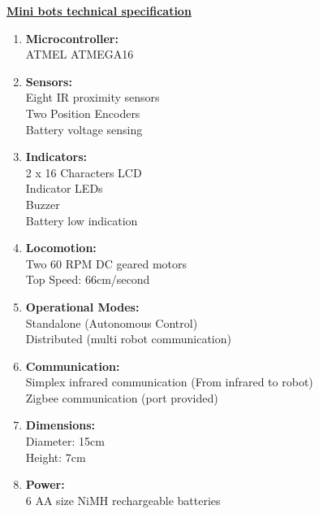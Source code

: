 \documentclass[a4paper,12pt,oneside]{book}
\begin{document}
	\underline{\textbf{\Large{Mini bots technical specification}}}
	\begin{enumerate}
		\item{\textbf{\large{Microcontroller:}}\\ATMEL ATMEGA16}
		\item{\textbf{\large{Sensors:}}\\Eight IR proximity sensors\\Two Position Encoders\\Battery voltage sensing}
		\item{\textbf{\large{Indicators:}}\\2 x 16 Characters LCD\\
			Indicator LEDs\\
			Buzzer\\
			Battery low indication}\\
		\item{\textbf{\large{Locomotion:}}\\Two 60 RPM DC geared motors\\Top Speed: 66cm/second\\}
		\item{\textbf{\large{Operational Modes:}}\\Standalone (Autonomous Control)\\
			Distributed (multi robot communication)\\} 
		\item{\textbf{\large{Communication:}}\\Simplex infrared communication (From infrared to robot)\\
		Zigbee communication (port provided)\\} 
		\item{\textbf{\large{Dimensions:}}\\Diameter: 15cm\\
			Height: 7cm\\} 
		\item{\textbf{\large{Power:}}\\6 AA size NiMH rechargeable batteries} 
	\end{enumerate}
\end{document}
